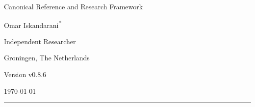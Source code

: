 \documentclass[11pt]{article}
\theoremstyle{definition}
\theoremstyle{plain}
\theoremstyle{remark}
\begin{document}
    
    \thispagestyle{empty}

    \begin{center}
        \vspace*{0.06\textheight}

        {\LARGE\bfseries \papertitle\par}
        \vspace{0.45cm}

        {\large Canonical Reference and Research Framework\par}
        \vspace{1.0cm}

        {\Large Omar Iskandarani\textsuperscript{*}\par}
        \vspace{0.35cm}

        {\normalsize Independent Researcher\par}
        {\normalsize Groningen, The Netherlands\par}
        \vspace{0.6cm}

        {\normalsize Version v0.8.6\par}
        {\normalsize \today\par}
        \vspace{0.9cm}

        \rule{0.82\textwidth}{0.5pt}
        \vspace{0.7cm}
    \end{center}

    \begin{abstract}
        \noindent
        This document presents Swirl-String Theory (SST) as a structured canonical synthesis rather than as a claim that every phenomenological sector has already been derived to theorem level. The text consolidates the primitive constant chain linking the effective fluid density, characteristic swirl speed, Compton anchoring, and horn/circulation scale; records delay-induced mode selection as the preferred non-operator route to spectral discreteness; and organizes the atomic bridge, spectroscopic filter, relational-time sector, and topology-based mass program within one explicitly stratified framework. Throughout, orthodox inputs, SST-internal derivations, bridge-level constructions, and conjectural extensions are kept distinct so that the canon remains internally coherent, externally comparable, and open to falsification.
    \end{abstract}
\end{document}
